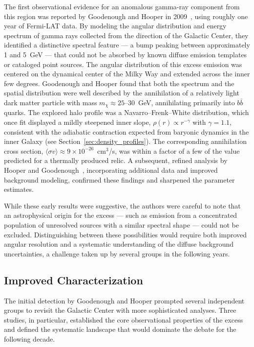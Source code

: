 The first observational evidence for an anomalous gamma-ray component from this region was reported by Goodenough and Hooper in 2009~\cite{Goodenough:2009gk}, using roughly one year of Fermi-LAT data.
By modeling the angular distribution and energy spectrum of gamma rays collected from the direction of the Galactic Center, they identified a distinctive spectral feature --- a bump peaking between approximately 1 and 5~GeV --- that could not be absorbed by known diffuse emission templates or cataloged point sources.
The angular distribution of this excess emission was centered on the dynamical center of the Milky Way and extended across the inner few degrees.
Goodenough and Hooper found that both the spectrum and the spatial distribution were well described by the annihilation of a relatively light dark matter particle with mass $m_\chi \approx 25$--$30$~GeV, annihilating primarily into $b\bar{b}$ quarks.
The explored halo profile was a Navarro--Frenk--White distribution, which once fit displayed a mildly steepened inner slope, $\rho(r) \propto r^{-\gamma}$ with $\gamma = 1.1$, consistent with the adiabatic contraction expected from baryonic dynamics in the inner Galaxy (see Section~\ref{sec:density_profiles}).
The corresponding annihilation cross section, $\langle \sigma v \rangle \approx 9 \times 10^{-26}$~cm$^3$/s, was within a factor of a few of the value predicted for a thermally produced relic.
A subsequent, refined analysis by Hooper and Goodenough~\cite{Hooper:2010mq}, incorporating additional data and improved background modeling, confirmed these findings and sharpened the parameter estimates.

While these early results were suggestive, the authors were careful to note that an astrophysical origin for the excess --- such as emission from a concentrated population of unresolved sources with a similar spectral shape --- could not be excluded.
Distinguishing between these possibilities would require both improved angular resolution and a systematic understanding of the diffuse background uncertainties, a challenge taken up by several groups in the following years.

\subsection{Improved Characterization}
\label{sec:4.1.2}

The initial detection by Goodenough and Hooper prompted several independent groups to revisit the Galactic Center with more sophisticated analyses.
Three studies, in particular, established the core observational properties of the excess and defined the systematic landscape that would dominate the debate for the following decade.

